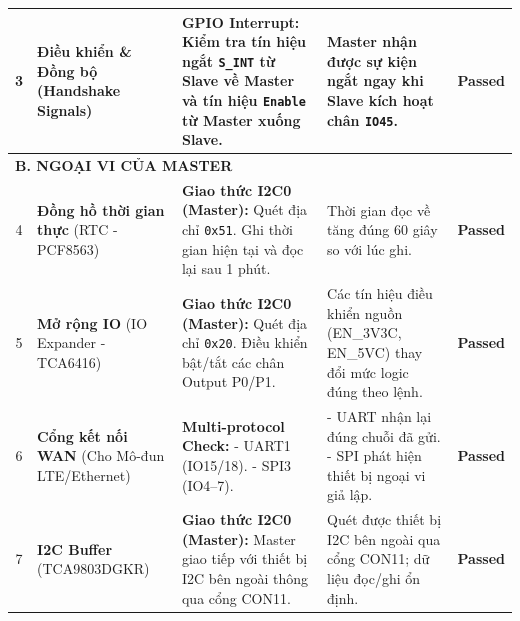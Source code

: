 \begin{longtable}{|c|p{3.5cm}|p{5cm}|p{3.5cm}|c|}
            3 & \textbf{Điều khiển \& Đồng bộ} \newline (Handshake Signals) & \textbf{GPIO Interrupt:} \newline Kiểm tra tín hiệu ngắt \texttt{S\_INT} từ Slave về Master và tín hiệu \texttt{Enable} từ Master xuống Slave. & Master nhận được sự kiện ngắt ngay khi Slave kích hoạt chân \texttt{IO45}. & \textcolor{modern_blue}{\textbf{Passed}} \\ \hline

            \multicolumn{5}{|l|}{\textbf{B. NGOẠI VI CỦA MASTER}} \\ \hline

            4 & \textbf{Đồng hồ thời gian thực} \newline (RTC - PCF8563) & \textbf{Giao thức I2C0 (Master):} \newline Quét địa chỉ \texttt{0x51}. Ghi thời gian hiện tại và đọc lại sau 1 phút. & Thời gian đọc về tăng đúng 60 giây so với lúc ghi. & \textcolor{modern_blue}{\textbf{Passed}} \\ \hline

            5 & \textbf{Mở rộng IO} \newline (IO Expander - TCA6416) & \textbf{Giao thức I2C0 (Master):} \newline Quét địa chỉ \texttt{0x20}. Điều khiển bật/tắt các chân Output P0/P1. & Các tín hiệu điều khiển nguồn (EN\_3V3C, EN\_5VC) thay đổi mức logic đúng theo lệnh. & \textcolor{modern_blue}{\textbf{Passed}} \\ \hline

            6 & \textbf{Cổng kết nối WAN} \newline (Cho Mô-đun LTE/Ethernet) & \textbf{Multi-protocol Check:} \newline - UART1 (IO15/18). \newline - SPI3 (IO4--7). & - UART nhận lại đúng chuỗi đã gửi. \newline - SPI phát hiện thiết bị ngoại vi giả lập. & \textcolor{modern_blue}{\textbf{Passed}} \\ \hline

            7 & \textbf{I2C Buffer} \newline (TCA9803DGKR) & \textbf{Giao thức I2C0 (Master):} \newline Master giao tiếp với thiết bị I2C bên ngoài thông qua cổng CON11. & Quét được thiết bị I2C bên ngoài qua cổng CON11; dữ liệu đọc/ghi ổn định. & \textcolor{modern_blue}{\textbf{Passed}} \\ \hline


\end{longtable}
